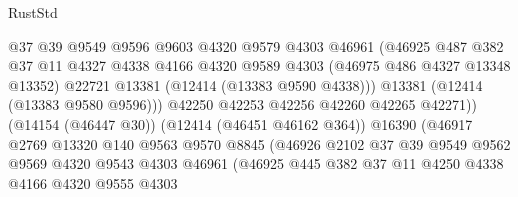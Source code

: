 \begin{lexlean}{RustStd}
\begin{coremodule}
{\begin{coremodule}
{{{{{{{{{{{{{{{{{{{{{{{{{{{{{{{{{{{{{{{{{{{{{{{{{{                                  @37
                                  @39
                                  @9549
                                  @9596
                                  @9603
                                  @4320
                                  @9579
                                  @4303
                                  @46961
                                  (@46925
                                    @487
                                    @382
                                    @37
                                    @11
                                    @4327
                                    @4338
                                    @4166
                                    @4320
                                    @9589
                                    @4303
                                    (@46975 @486 @4327 @13348 @13352)
                                    @22721
                                    @13381
                                    (@12414 (@13383 @9590 @4338)))
                                  @13381
                                  (@12414 (@13383 @9580 @9596)))
                                @42250
                                @42253
                                @42256
                                @42260
                                @42265
                                @42271))
                            (@14154 (@46447 @30))
                            (@12414 (@46451 @46162 @364))
                            @16390
                            (@46917
                              @2769
                              @13320
                              @140
                              @9563
                              @9570
                              @8845
                              (@46926
                                @2102
                                @37
                                @39
                                @9549
                                @9562
                                @9569
                                @4320
                                @9543
                                @4303
                                @46961
                                (@46925
                                  @445
                                  @382
                                  @37
                                  @11
                                  @4250
                                  @4338
                                  @4166
                                  @4320
                                  @9555
                                  @4303
}}}}}}}}}}}}}}}}}}}}}}}}}}}}}}}}}}}}}}}}}}}}}}}}}}
\end{coremodule}}
\end{coremodule}
\end{lexlean}
